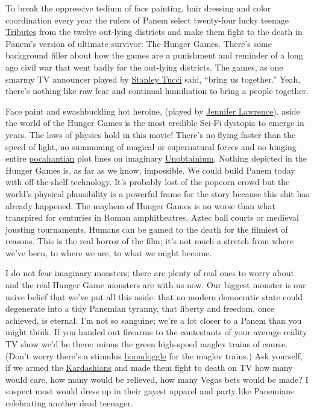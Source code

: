 To break the oppressive tedium of face painting, hair dressing and color
coordination every year the rulers of Panem select twenty-four lucky
teenage \href{http://thehungergames.wikia.com/wiki/Tributes}{Tributes}
from the twelve out-lying districts and make them fight to the death in
Panem's version of ultimate survivor: The Hunger Games. There's some
background filler about how the games are a punishment and reminder of a
long ago civil war that went badly for the out-lying districts. The
games, as one smarmy TV announcer played by
\href{http://www.imdb.com/name/nm0001804/}{Stanley Tucci} said, ``bring
us together.'' Yeah, there's nothing like raw fear and continual
humiliation to bring a people together.

Face paint and swashbuckling hot heroine, (played by
\href{http://www.imdb.com/name/nm2225369}{Jennifer Lawrence}), aside the
world of the Hunger Games is the most credible Sci-Fi dystopia to emerge
in years. The laws of physics hold in this movie! There's no flying
faster than the speed of light, no summoning of magical or supernatural
forces and no hinging entire
\href{http://www.huffingtonpost.com/2010/01/04/avatar-pocahontas-in-spac\_n\_410538.html}{pocahantian}
plot lines on imaginary
\href{http://open.salon.com/blog/the\_new\_number\_two/2010/01/18/unobtainium\_is\_a\_joke\_and\_so\_is\_your\_movie}{Unobtainium}.
Nothing depicted in the Hunger Games is, as far as we know, impossible.
We could build Panem today with off-the-shelf technology. It's probably
lost of the popcorn crowd but the world's physical plausibility is a
powerful frame for the story because this shit has already happened. The
mayhem of Hunger Games is no worse than what transpired for centuries in
Roman amphitheatres, Aztec ball courts or medieval jousting tournaments.
Humans can be gamed to the death for the filmiest of reasons. This is
the real horror of the film; it's not much a stretch from where we've
been, to where we are, to what we might become.

I do not fear imaginary monsters; there are plenty of real ones to worry
about and the real Hunger Game monsters are with us now. 
Our biggest monster is our naive belief that we've put all this
aside: that no modern democratic state could degenerate into a tidy
Panemian tyranny, that liberty and freedom, once achieved, is eternal.
I'm not so sanguine; we're a lot closer to a Panem than you might think.
If you handed out firearms to the contestants of your average reality TV
show we'd be there: minus the green high-speed maglev trains of course.
(Don't worry there's a stimulus
\href{http://highspeedboondoggle.com/}{boondoggle} for the maglev
trains.) Ask yourself, if we armed the
\href{http://www.eonline.com/on/shows/kardashians/index.html}{Kardashians}
and made them fight to death on TV how many would care, how many
would be relieved, how many Vegas bets would be made? I suspect most
would dress up in their gayest apparel and party like Panemians
celebrating another dead teenager.




%